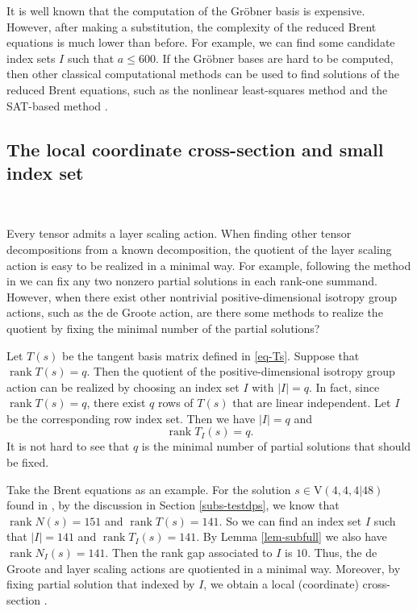 \documentclass[reqno]{amsart}
\theoremstyle{definition}
\numberwithin{equation}{section}
\theoremstyle{remark}
\begin{document}
It is well known that the computation of the Gröbner basis is expensive. However,  after making a substitution, the complexity of the reduced Brent equations is much lower than before. For example, we can find some candidate index sets $I$ such that $a\leq 600$.  If the Gröbner bases are hard to be computed, then other classical computational methods can be used to find solutions of the reduced Brent equations, such as the nonlinear least-squares method \cite{kaporin24-cmmp,kaporin24-Dokl,CV25} and the SAT-based method \cite{Heule21}.


\subsection{The local coordinate cross-section and small index set}
\

Every tensor admits a layer scaling action. When finding other tensor decompositions from a known decomposition, the quotient of the layer scaling action is easy to be realized in a minimal way. For example, following the method in \cite{HOOS2019} we can fix any two nonzero partial solutions in each rank-one summand.
However, when there exist other nontrivial positive-dimensional isotropy group actions, such as the de Groote action, are there some methods to realize the quotient by fixing the minimal number of the partial solutions?

Let $T(s)$ be the tangent basis matrix defined in \ref{eq-Ts}. Suppose that
$\operatorname{rank}T(s)=q$. Then the quotient of the positive-dimensional isotropy group action can be realized by choosing an index set $I$ with $|I|=q$. In fact, since 
$\operatorname{rank}T(s)=q$, there exist $q$ rows of $T(s)$ that are linear independent. Let $I$ be the corresponding row index set. Then we have $|I|=q$ and
$$\operatorname{rank}T_I(s)=q.$$
It is not hard to see that $q$ is the minimal number of partial solutions that should be fixed.

Take the Brent equations as an example. For the solution $s\in \mathrm{V}(4,4,4|48)$ found in \cite{dumas25}, by the discussion in Section \ref{subs-testdps}, we know that $\operatorname{rank}N(s)=151$ and $\operatorname{rank}T(s)=141$. So we can find an index set $I$ such that $|I|=141$ and $\operatorname{rank}T_I(s)=141$. By Lemma \ref{lem-subfull} we also have $\operatorname{rank}N_I(s)=141$. Then the rank gap associated to $I$ is $10$. Thus, the de Groote and layer scaling actions are quotiented in a minimal way. Moreover, by fixing partial solution that indexed by $I$, we obtain a local (coordinate) cross-section \cite{Hubert07sa,olver12mf}.
\end{document}
